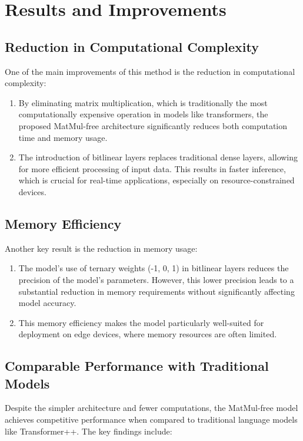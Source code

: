 \documentclass{report}
\begin{document}
	
	
	
	
	
	\section{Results and Improvements}
	\subsection{Reduction in Computational Complexity}
	One of the main improvements of this method is the reduction in computational complexity:
	
	\begin{enumerate}
		\item 
		By eliminating matrix multiplication, which is traditionally the most computationally expensive operation in models like transformers, the proposed MatMul-free architecture significantly reduces both computation time and memory usage.
		
		\item 
		The introduction of bitlinear layers replaces traditional dense layers, allowing for more efficient processing of input data. This results in faster inference, which is crucial for real-time applications, especially on resource-constrained devices.
	\end{enumerate}
	
	
	\subsection{Memory Efficiency}
	Another key result is the reduction in memory usage:
	\begin{enumerate}
		\item 
		The model’s use of ternary weights (-1, 0, 1) in bitlinear layers reduces the precision of the model's parameters. However, this lower precision leads to a substantial reduction in memory requirements without significantly affecting model accuracy.
		
		\item 
		This memory efficiency makes the model particularly well-suited for deployment on edge devices, where memory resources are often limited.
	\end{enumerate}
	
	
	\subsection{Comparable Performance with Traditional Models}
	Despite the simpler architecture and fewer computations, the MatMul-free model achieves competitive performance when compared to traditional language models like Transformer++. The key findings include:
	
\end{document}

